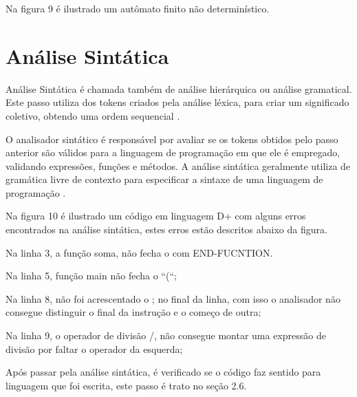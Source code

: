 \documentclass[12pt,oneside,a4paper,chapter=TITLE,section=TITLE,sumario=tradicional]{abntex2}
\begin{document}
Na figura 9 é ilustrado um autômato finito não determinístico.

\begin{figure}[H]
\end{figure}

\section{Análise Sintática}
\label{sec:analise-sintatica}

Análise Sintática é chamada também de análise hierárquica ou análise gramatical. Este passo utiliza dos tokens criados pela análise léxica, para criar um significado coletivo, obtendo uma ordem sequencial \cite{alfred1995}.

O analisador sintático é responsável por avaliar se os tokens obtidos pelo passo anterior são válidos para a linguagem de programação em que ele é empregado, validando expressões, funções e métodos. A análise sintática geralmente utiliza de gramática livre de contexto para especificar a sintaxe de uma linguagem de programação \cite{maragon2015}.

Na figura 10 é ilustrado um código em linguagem D+ com alguns erros encontrados na análise sintática, estes erros estão descritos abaixo da figura.

\begin{figure}[htb]
\end{figure}

\begin{lista}
	\item Na linha 3, a função soma, não fecha o com END-FUCNTION.
	\item Na linha 5, função main não fecha o “(“;
	\item Na linha 8, não foi acrescentado o ; no final da linha, com isso o analisador não consegue distinguir o final da instrução e o começo de outra;
	\item Na linha 9, o operador de divisão /, não consegue montar uma expressão de divisão por faltar o operador da esquerda;
\end{lista}

Após passar pela análise sintática, é verificado se o código faz sentido para linguagem que foi escrita, este passo é trato no seção 2.6.
\end{document}
